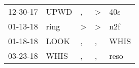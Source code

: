 \begin{supertabular}{lllll}
 12-30-17 &  UPWD &             , &  \textgreater &   40s \\
 01-13-18 &  ring &  \textgreater &  \textgreater &   n2f \\
 01-18-18 &  LOOK &             , &             , &  WHIS \\
 03-23-18 &  WHIS &             , &             , &  reso \\
\end{supertabular}

